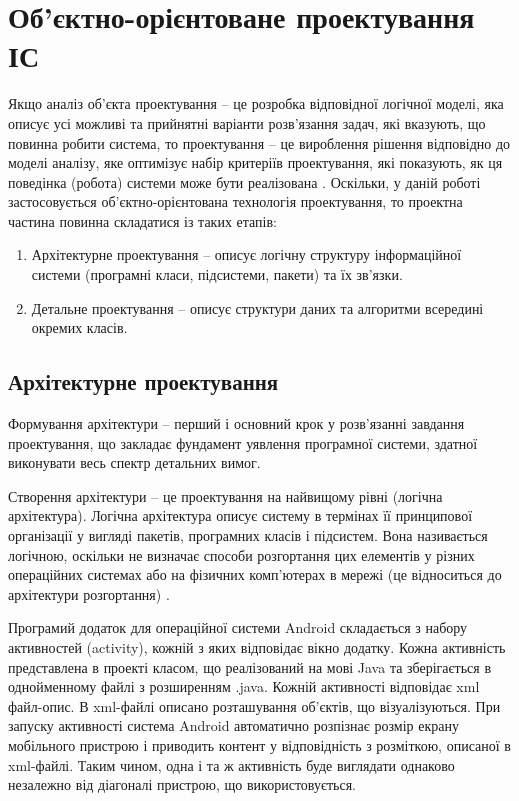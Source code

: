 \documentclass[../main.tex]{subfiles}
\begin{document}
\chapter{Об’єктно-орієнтоване проектування ІС}

Якщо аналіз об’єкта проектування – це розробка відповідної логічної моделі, яка описує усі можливі та прийнятні варіанти розв’язання задач, які вказують, що повинна робити система, то проектування – це вироблення рішення відповідно до моделі аналізу, яке оптимізує набір критеріїв проектування, які  показують, як ця поведінка (робота) системи може бути реалізована \cite{diploma_guidelines}.
Оскільки, у даній роботі застосовується об’єктно-орієнтована технологія проектування, то проектна частина повинна складатися із таких етапів:

\begin{enumerate}
	\item Архітектурне проектування – описує логічну структуру інформаційної системи (програмні класи, підсистеми,  пакети) та їх зв’язки.
	\item Детальне проектування – описує структури даних та алгоритми всередині окремих класів. 
\end{enumerate}

\section{Архітектурне проектування}
Формування архітектури – перший і основний крок у розв’язанні завдання проектування, що закладає фундамент уявлення програмної системи, здатної виконувати весь спектр детальних вимог. \cite{diploma_guidelines2}

Створення архітектури – це проектування на найвищому рівні (логічна архітектура). Логічна архітектура описує систему в термінах її принципової організації у вигляді пакетів, програмних класів і підсистем. Вона називається логічною, оскільки не визначає способи розгортання цих елементів у різних операційних системах або на фізичних комп’ютерах в мережі (це відноситься до архітектури розгортання) \cite{diploma_guidelines}.

Програмий додаток для операційної системи Android складається з набору активностей (activity), кожній з яких відповідає вікно додатку. Кожна активність представлена в проекті класом, що реалізований на мові Java та зберігається в однойменному файлі з розширенням .java. Кожній активності відповідає xml файл-опис. В xml-файлі описано розташування об'єктів, що візуалізуються. При запуску активності система Android автоматично розпізнає розмір екрану мобільного пристрою і приводить контент у відповідність з розміткою, описаної в xml-файлі. Таким чином, одна і та ж активність буде виглядати однаково незалежно від діагоналі пристрою, що використовується. 
\end{document}
